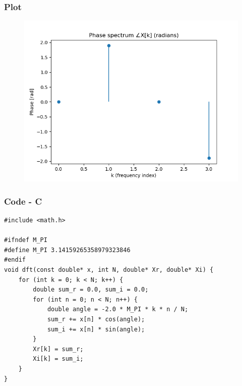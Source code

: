 \documentclass{beamer}
\theoremstyle{remark}
\numberwithin{equation}{section}
\begin{document}
\begin{frame}
    \frametitle{Plot}
\begin{figure}[H]
   \centering
   \includegraphics[width=0.8\columnwidth]{figs/fig5.png}
   \caption{}
   \label{}
   \end{figure}
\end{frame}

\begin{frame}[fragile]
    \frametitle{Code - C}
    \begin{lstlisting}
#include <math.h>

#ifndef M_PI
#define M_PI 3.14159265358979323846
#endif
void dft(const double* x, int N, double* Xr, double* Xi) {
    for (int k = 0; k < N; k++) {
        double sum_r = 0.0, sum_i = 0.0;
        for (int n = 0; n < N; n++) {
            double angle = -2.0 * M_PI * k * n / N;
            sum_r += x[n] * cos(angle);
            sum_i += x[n] * sin(angle);
        }
        Xr[k] = sum_r;
        Xi[k] = sum_i;
    }
}


    \end{lstlisting}
    \end{frame}
\end{document}
